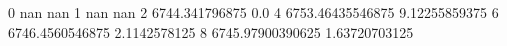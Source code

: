 0 nan nan
1 nan nan
2 6744.341796875 0.0
4 6753.46435546875 9.12255859375
6 6746.4560546875 2.1142578125
8 6745.97900390625 1.63720703125
